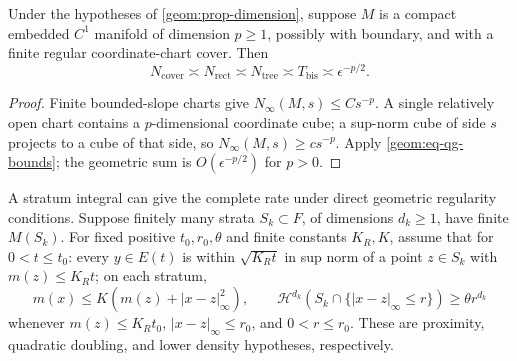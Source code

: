 \begin{corollary}\label{geom:prop-manifold}
Under the hypotheses of \cref{geom:prop-dimension}, suppose $M$ is a
compact embedded $C^1$ manifold of dimension $p\geq1$, possibly with
boundary, and with a finite regular coordinate-chart cover. Then
\[
 N_{\mathrm{cover}}\asymp N_{\mathrm{rect}}
 \asymp N_{\mathrm{tree}}\asymp T_{\mathrm{bis}}
 \asymp\epsilon^{-p/2}.
\]
\end{corollary}
\begin{proof}
Finite bounded-slope charts give $N_\infty(M,s)\leq Cs^{-p}$.
A single relatively open chart contains a $p$-dimensional coordinate
cube; a sup-norm cube of side $s$ projects to a cube of that side, so
$N_\infty(M,s)\geq cs^{-p}$. Apply \cref{geom:eq-qg-bounds}; the
geometric sum is $O(\epsilon^{-p/2})$ for $p>0$.
\end{proof}

A stratum integral can give the complete rate under direct geometric
regularity conditions. Suppose finitely many strata $S_k\subset F$,
of dimensions $d_k\geq1$, have finite $M(S_k)$. For fixed positive
$t_0,r_0,\theta$ and finite constants $K_R,K$, assume that for
$0<t\leq t_0$: every $y\in E(t)$ is within
$\sqrt{K_Rt}$ in sup norm of a point $z\in S_k$ with $m(z)\leq K_Rt$;
on each stratum,
\[
 m(x)\leq K(m(z)+|x-z|_\infty^2),\qquad
 \mathcal H^{d_k}(S_k\cap\{ |x-z|_\infty\leq r\})
       \geq\theta r^{d_k}
\]
whenever $m(z)\leq K_Rt_0$, $|x-z|_\infty\leq r_0$, and
$0<r\leq r_0$. These are proximity, quadratic doubling, and lower
density hypotheses, respectively.

